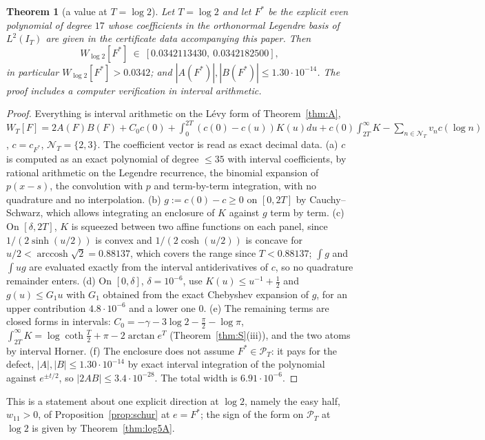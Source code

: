 \documentclass[11pt]{amsart}
\newtheorem{theorem}{Theorem}[section]
\theoremstyle{definition}
\theoremstyle{remark}
\newcommand{\PT}{\mathcal P_T}
\newcommand{\IT}{I_T}
\newcommand{\NT}{\mathcal N_T}
\begin{document}
\begin{theorem}[a value at $T=\log2$]\label{thm:w11}
Let $T=\log2$ and let $F^*$ be the explicit even polynomial of degree $17$ whose coefficients in the
orthonormal Legendre basis of $L^2(\IT)$ are given in the certificate data accompanying this paper. Then
\[
W_{\log2}[F^*]\ \in\ [0.0342113430,\ 0.0342182500],
\]
in particular $W_{\log2}[F^*]>0.0342$; and $|A(F^*)|,|B(F^*)|\le1.30\cdot10^{-14}$. The proof includes a computer
verification in interval arithmetic.
\end{theorem}
\begin{proof}
Everything is interval arithmetic on the L\'evy form of Theorem~\ref{thm:A},
$W_T[F]=2A(F)B(F)+C_0c(0)+\int_0^{2T}(c(0)-c(u))K(u)du+c(0)\int_{2T}^\infty K-\sum_{n\in\NT}v_nc(\log n)$,
$c=c_{F^*}$, $\NT=\{2,3\}$. The coefficient vector is read as exact decimal data. (a) $c$ is computed as an exact
polynomial of degree $\le35$ with interval coefficients, by rational arithmetic on the Legendre recurrence, the
binomial expansion of $p(x-s)$, the convolution with $p$ and term-by-term integration, with no quadrature and no
interpolation. (b) $g:=c(0)-c\ge0$ on $[0,2T]$ by Cauchy--Schwarz, which allows integrating an enclosure of $K$
against $g$ term by term. (c) On $[\delta,2T]$, $K$ is squeezed between two affine functions on each panel, since
$1/(2\sinh(u/2))$ is convex and $1/(2\cosh(u/2))$ is concave for $u/2<\operatorname{arccosh}\sqrt2=0.88137$, which covers
the range since $T<0.88137$; $\int g$ and $\int ug$ are evaluated exactly from the interval antiderivatives of $c$, so
no quadrature remainder enters. (d) On $[0,\delta]$, $\delta=10^{-6}$, use $K(u)\le u^{-1}+\frac12$ and $g(u)\le G_1u$
with $G_1$ obtained from the exact Chebyshev expansion of $g$, for an upper contribution $4.8\cdot10^{-6}$ and a lower
one $0$. (e) The remaining terms are closed forms in intervals: $C_0=-\gamma-3\log2-\frac\pi2-\log\pi$,
$\int_{2T}^\infty K=\log\coth\frac T2+\pi-2\arctan e^{T}$ (Theorem~\ref{thm:S}(iii)), and the two atoms by interval
Horner. (f) The enclosure does not assume $F^*\in\PT$: it pays for the defect,
$|A|,|B|\le1.30\cdot10^{-14}$ by exact interval integration of the polynomial against $e^{\pm t/2}$, so
$|2AB|\le3.4\cdot10^{-28}$. The total width is $6.91\cdot10^{-6}$.
\end{proof}

This is a statement about one explicit direction at $\log2$, namely the easy half, $w_{11}>0$, of
Proposition~\ref{prop:schur} at $e=F^*$; the sign of the form on $\PT$ at $\log2$ is given by
Theorem~\ref{thm:log5A}.
\end{document}
